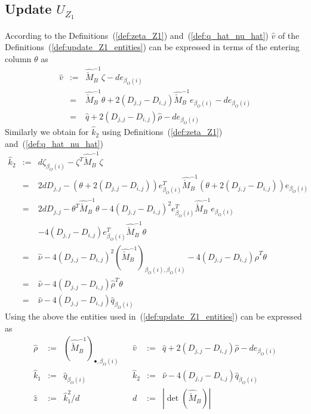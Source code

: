 \documentclass[a4paper]{article}
\begin{document}
\subsection{Update $U_{Z_{1}}$}
According to the Definitions~(\ref{def:zeta_Z1})
and~(\ref{def:q_hat_nu_hat}) $\hat{v}$ of the 
Definitions~(\ref{def:update_Z1_entities}) can be expressed in terms
of the entering column $\theta$ as
\begin{eqnarray*}
\hat{v}
&:=&
\hat{\check{M}}_{B}^{-1}\zeta - de_{\beta_{O}(i)} \\
&=&
\hat{\check{M}}_{B}^{-1}\theta
+2\left(D_{j,j}-D_{i,j}\right)\hat{\check{M}}_{B}^{-1}e_{\beta_{O}(i)}
-de_{\beta_{O}(i)} \\
&=&
\hat{q}+2\left(D_{j,j}-D_{i,j}\right)\hat{\rho}-de_{\beta_{O}(i)}
\end{eqnarray*}
Similarly we obtain for $\hat{k}_{2}$ using Definitions~(\ref{def:zeta_Z1})
and~(\ref{def:q_hat_nu_hat})
\begin{eqnarray*}
\hat{k}_{2}
&:=&
d\zeta_{\beta_{O}(i)}-\zeta^{T}\hat{\check{M}}_{B}^{-1}\zeta \\
&=&
2dD_{j,j}
-\left(\theta+2\left(D_{j,j}-D_{i,j}\right)\right)e_{\beta_{O}(i)}^{T}
\hat{\check{M}}_{B}^{-1}
\left(\theta+2\left(D_{j,j}-D_{i,j}\right)\right)e_{\beta_{O}(i)} \\
&=&
2dD_{j,j}-\theta^{T}\hat{\check{M}}_{B}^{-1}\theta
-4\left(D_{j,j}-D_{i,j}\right)^{2}
e_{\beta_{O}(i)}^{T}\hat{\check{M}}_{B}^{-1}e_{\beta_{O}(i)} \\
&&
-4\left(D_{j,j}-D_{i,j}\right)
e_{\beta_{O}(i)}^{T}\hat{\check{M}}_{B}^{-1}\theta \\
&=&
\hat{\nu}
-4\left(D_{j,j}-D_{i,j}\right)^{2}
\left(\hat{\check{M}}_{B}^{-1}\right)_{\beta_{O}(i), \beta_{O}(i)}
-4\left(D_{j,j}-D_{i,j}\right)\hat{\rho}^{T}\theta \\
&=&
\hat{\nu}
-4\left(D_{j,j}-D_{i,j}\right)\hat{\rho}^{T}\theta \\
&=&
\hat{\nu}
-4\left(D_{j,j}-D_{i,j}\right)\hat{q}_{\beta_{O}(i)}
\end{eqnarray*}
Using the above the entities used
in~(\ref{def:update_Z1_entities}) can be expressed as
\begin{equation}
\label{def:update_Z1_entities_prep}
\begin{array}{rclcrcl}
\hat{\rho}
&:=&
\left(\hat{\check{M}}_{B}^{-1}\right)_{\bullet, \beta_{O}(i)}
&&
\hat{v}
&:=&
\hat{q}+2\left(D_{j,j}-D_{i,j}\right)\hat{\rho}-de_{\beta_{O}(i)}
\\
\hat{k}_{1}
&:=&
\hat{q}_{\beta_{O}(i)}
&&
\hat{k}_{2}
&:=&
\hat{\nu}
-4\left(D_{j,j}-D_{i,j}\right)\hat{q}_{\beta_{O}(i)}
\\
\hat{z}
&:=&
\hat{k}_{1}^{2}/d
&&
d
&:=&
\left|\det(\hat{\check{M}}_{B})\right|
\end{array}
\end{equation}
\end{document}
